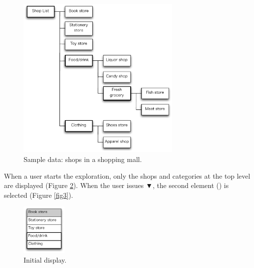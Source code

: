 \documentclass{article}
\def\down{▼}
\begin{document}
\begin{figure}[H]
\centerline{\includegraphics[width=80mm,bb=0 0 490 490]{figures/fig1.pdf}}
\caption{Sample data: shops in a shopping mall.}
\label{fig1}
\end{figure}

When a user starts the exploration, only the shops and categories
at the top level are displayed (Figure \ref{fig2}).
When the user issues {\down},
the second element () is selected (Figure \ref{fig3}).

\def\menuwidth{22mm}

\begin{figure}[H]
\centerline{\includegraphics[width=\menuwidth, bb=0 0 139 157]{figures/fig2.pdf}}
\caption{Initial display.}
\label{fig2}
\end{figure}
\end{document}
